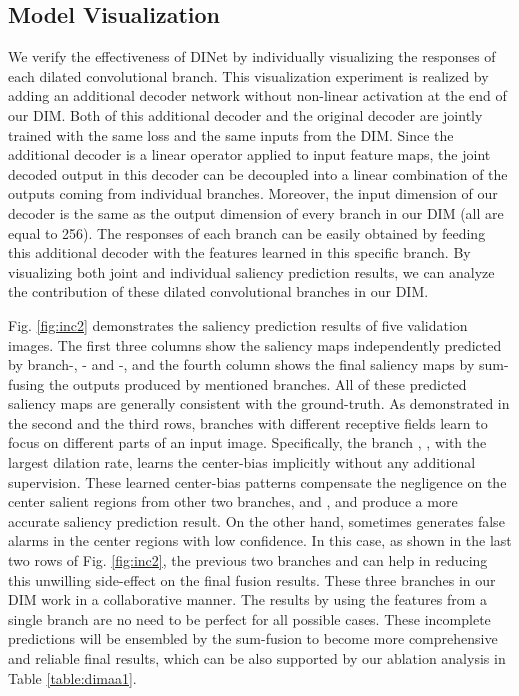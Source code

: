 \subsection{Model Visualization}
 We verify the effectiveness of DINet by individually visualizing the responses of each dilated convolutional branch. This visualization experiment is realized by adding an additional decoder network without non-linear activation at the end of our DIM. Both of this additional decoder and the original decoder are jointly trained with the same loss and the same inputs from the DIM. Since the additional decoder is a linear operator applied to input feature maps, the joint decoded output in this decoder can be decoupled into a linear combination of the outputs coming from individual branches. Moreover, the input dimension of our decoder is the same as the output dimension of every branch in our DIM (all are equal to 256). The responses of each branch can be easily obtained by feeding this additional decoder with the features learned in this specific branch. By visualizing both joint and individual saliency prediction results, we can analyze the contribution of these dilated convolutional branches in our DIM.








	Fig. \ref{fig:inc2} demonstrates the saliency prediction results of five validation images. The first three columns show the saliency maps independently predicted by branch-, - and -, and the fourth column shows the final saliency maps by sum-fusing the outputs produced by mentioned branches. All of these predicted saliency maps are generally consistent with the ground-truth. As demonstrated in the second and the third rows, branches with different receptive fields learn to focus on different parts of an input image. Specifically, the branch , \ie , with the largest dilation rate, learns the center-bias implicitly without any additional supervision. These learned center-bias patterns compensate the negligence on the center salient regions from other two branches,  and , and produce a more accurate saliency prediction result. On the other hand,  sometimes generates false alarms in the center regions with low confidence. In this case, as shown in the last two rows of Fig. \ref{fig:inc2}, the previous two branches  and  can help in reducing this unwilling side-effect on the final fusion results. These three branches in our DIM work in a collaborative manner. The results by using the features from a single branch are no need to be perfect for all possible cases. These incomplete predictions will be ensembled by the sum-fusion to become more comprehensive and reliable final results, which can be also supported by our ablation analysis in Table \ref{table:dimaa1}.






